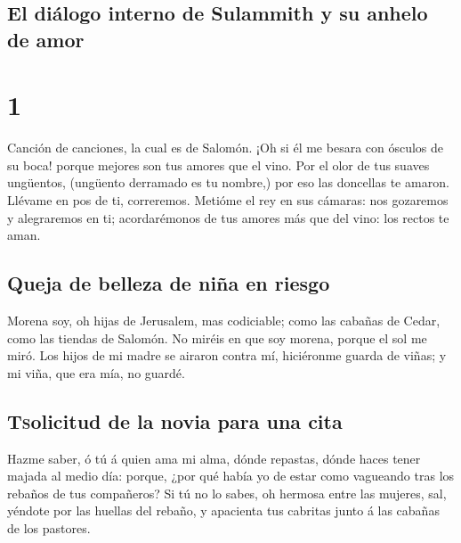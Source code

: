 \hypertarget{el-diuxe1logo-interno-de-sulammith-y-su-anhelo-de-amor}{%
\subsection{El diálogo interno de Sulammith y su anhelo de
amor}\label{el-diuxe1logo-interno-de-sulammith-y-su-anhelo-de-amor}}

\hypertarget{section-22-1}{%
\section{1}\label{section-22-1}}

 Canción de canciones, la cual es de Salomón.
 ¡Oh si él me besara con ósculos de su boca! porque
mejores son tus amores que el vino.  Por el olor de tus
suaves ungüentos, (ungüento derramado es tu nombre,) por eso las
doncellas te amaron.  Llévame en pos de ti, correremos.
Metióme el rey en sus cámaras: nos gozaremos y alegraremos en ti;
acordarémonos de tus amores más que del vino: los rectos te aman.

\hypertarget{queja-de-belleza-de-niuxf1a-en-riesgo}{%
\subsection{Queja de belleza de niña en
riesgo}\label{queja-de-belleza-de-niuxf1a-en-riesgo}}

 Morena soy, oh hijas de Jerusalem, mas codiciable; como
las cabañas de Cedar, como las tiendas de Salomón.  No
miréis en que soy morena, porque el sol me miró. Los hijos de mi madre
se airaron contra mí, hiciéronme guarda de viñas; y mi viña, que era
mía, no guardé.

\hypertarget{tsolicitud-de-la-novia-para-una-cita}{%
\subsection{\texorpdfstring{\textsc{Ts}olicitud de la novia para una
cita}{Tsolicitud de la novia para una cita}}\label{tsolicitud-de-la-novia-para-una-cita}}

 Hazme saber, ó tú á quien ama mi alma, dónde repastas,
dónde haces tener majada al medio día: porque, ¿por qué había yo de
estar como vagueando tras los rebaños de tus compañeros? 
Si tú no lo sabes, oh hermosa entre las mujeres, sal, yéndote por las
huellas del rebaño, y apacienta tus cabritas junto á las cabañas de los
pastores.

